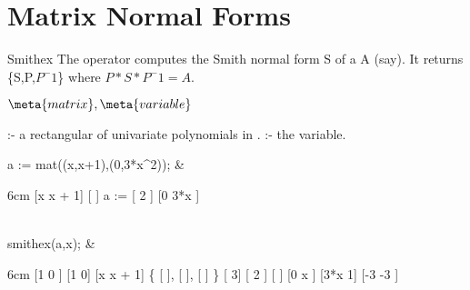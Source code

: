\section{Matrix Normal Forms}

\begin{Operator}{Smithex}
The operator  computes the Smith normal form S of a
 A (say). It returns \{S,P,$P^-1$\} where $P*S*P^-1 = A$.

\begin{Syntax}
\(\meta{matrix},\meta{variable}\)

 :- a rectangular  of univariate polynomials in 
                 .
 :- the variable.
\end{Syntax}

\begin{Examples}
 a := mat((x,x+1),(0,3*x^2)); &
\begin{multilineoutput}{6cm}
      [x  x + 1]
      [        ]
 a := [      2 ]
      [0  3*x  ]
\end{multilineoutput}\\

 smithex(a,x); &
\begin{multilineoutput}{6cm}
   [1  0 ]    [1    0]    [x   x + 1]
\{  [     ],   [      ],   [         ]  \}
   [    3]    [   2  ]    [         ]
   [0  x ]    [3*x  1]    [-3    -3 ]
\end{multilineoutput}\\
\end{Examples}
\end{Operator}


